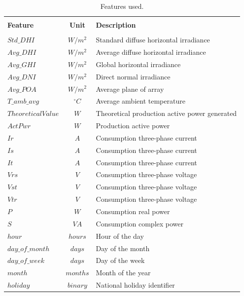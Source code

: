 \begin{longtable}{|l|c|l|}
    \caption{Features used.}
    \label{table3}\\
    
    \hline 
    & &\\[-0.5ex]
    \textbf{Feature}   & \textbf{Unit} & \textbf{Description}\\[1ex]
    \hline
     & &\\[-0.5ex]
    \textbf{$Std\_DHI$} & $W/m^2$ & Standard diffuse horizontal irradiance\\
    \textbf{$Avg\_DHI$} & $W/m^2$ & Average diffuse horizontal irradiance \\
    \textbf{$Avg\_GHI$} & $W/m^2$ & Global horizontal irradiance \\
    \textbf{$Avg\_DNI$} & $W/m^2$ & Direct normal irradiance \\
    \textbf{$Avg\_POA$} & $W/m^2$ & Average plane of array\\
    \textbf{$T\_amb\_avg$} & $^\circ C$ & Average ambient temperature\\
    \textbf{$Theoretical Value$} & $W$ & Theoretical production active power generated\\
    \textbf{$ActPwr$} & $W$ & Production active power\\
    \textbf{$Ir$} & $A$ & Consumption three-phase current \\
    \textbf{$Is$} & $A$ & Consumption three-phase current \\
    \textbf{$It$} & $A$ & Consumption three-phase current \\
    \textbf{$Vrs$} & $V$ & Consumption three-phase voltage\\
    \textbf{$Vst$} & $V$ & Consumption three-phase voltage\\
    \textbf{$Vtr$} & $V$ & Consumption three-phase voltage\\
    \textbf{$P$} & $W$ & Consumption real power\\
    \textbf{$S$} & $VA$ & Consumption complex power\\
    \textbf{$hour$} & $hours$ & Hour of the day\\
    \textbf{$day\_of\_month$} & $days$ & Day of the month\\
    \textbf{$day\_of\_week$} & $days$ & Day of the week\\
    \textbf{$month$} & $months$ & Month of the year\\
    \textbf{$holiday$} & $binary$ & National holiday identifier\\[+1ex]
    \hline
    

\end{longtable}

